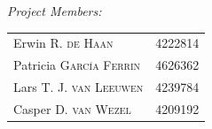 \documentclass[final]{report}
\begin{document}
\begin{titlingpage}
\begin{minipage}{0.45\textwidth}
\begin{flushleft} \large
\emph{Project Members:}\\
\begin{tabular}{ll}
Erwin R. \textsc{de Haan} & 4222814\\
Patricia \textsc{García Ferrin} & 4626362\\
Lars T. J. \textsc{van Leeuwen} & 4239784\\
Casper D. \textsc{van Wezel} & 4209192\\
\end{tabular}
\end{flushleft}
\end{minipage}\\[1.0cm]


{\large \theauthor}\\ [1.0cm] 

{\large \thedate}\\ [1.0cm]

\vfill %

\end{titlingpage}
\restoregeometry
\end{document}
